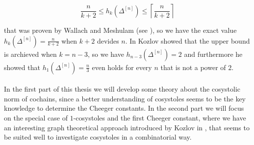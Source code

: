 \begin{equation}\label{equation1}
\frac{n}{k+2}\leq h_k(\Delta^{[n]})\leq\left\lceil\frac{n}{k+2}\right\rceil
\end{equation}

that was proven by Wallach and Meshulam (see \cite{4}), so we have the exact value \(h_k(\Delta^{[n]})=\frac{n}{k+2}\) when \(k+2\) devides \(n\). In \cite{1} Kozlov showed that the upper bound is archieved when \(k=n-3\), so we have \(h_{n-3}(\Delta^{[n]})=2\) and furthermore he showed that \(h_1(\Delta^{[n]})=\frac{n}{3}\) even holds for every \(n\) that is not a power of \(2\).\\
\\
In the first part of this thesis we will develop some theory about the cosystolic norm of cochains, since a better understanding of cosystoles seems to be the key knowledge to determine the Cheeger constants. In the second part we will focus on the special case of \(1\)-cosystoles and the first Cheeger constant, where we have an interesting graph theoretical approach introduced by Kozlov in \cite{1}, that seems to be suited well to investigate cosystoles in a combinatorial way.

